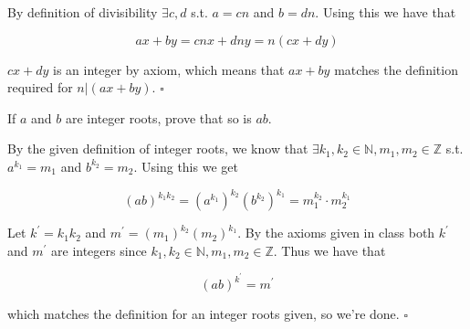 \documentclass[letterpaper, reqno,11pt]{article}
\newcommand{\ZZ}{\mathbb{Z}}
\newcommand{\NN}{\mathbb{N}}
\begin{document}
\medskip

By definition of divisibility $\exists c, d$ s.t. $a=cn$ and $b=dn$. Using this we have that 

$$
    ax+by=cnx+dny=n(cx+dy)
$$

$cx+dy$ is an integer by axiom, which means that $ax+by$ matches the definition required for $n|(ax+by)$. $\square$

 If $a$ and $b$ are integer roots, prove that so is $ab$. 

\medskip

By the given definition of integer roots, we know that $\exists k_1, k_2\in\NN, m_1, m_2\in\ZZ$ s.t. $a^{k_1}=m_1$ and $b^{k_2}=m_2$. Using this we get 

$$
    (ab)^{k_1k_2}=(a^{k_1})^{k_2}(b^{k_2})^{k_1}=m_1^{k_2}\cdot m_2^{k_1}
$$

Let $k^\prime=k_1k_2$ and $m^\prime=(m_1)^{k_2}(m_2)^{k_1}$. By the axioms given in class both $k^\prime$ and $m^\prime$ are integers since $k_1, k_2\in\NN, m_1, m_2\in\ZZ$. Thus we have that 

$$
    (ab)^{k^\prime}=m^\prime
$$

which matches the definition for an integer roots given, so we're done. $\square$
\end{document}
